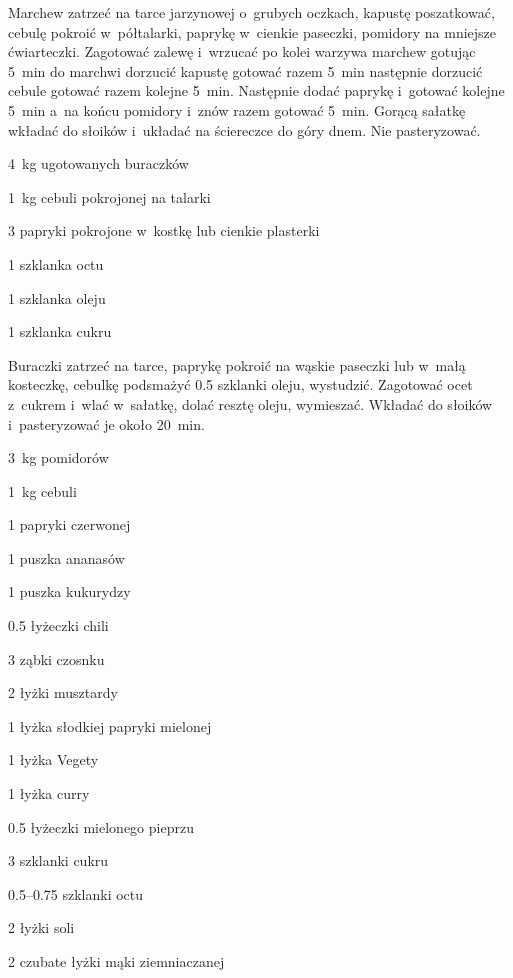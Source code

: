 \documentclass[../kucharek.tex]{subfiles}
\begin{document}
Marchew zatrzeć na tarce jarzynowej o~grubych oczkach, kapustę poszatkować,
cebulę pokroić w~półtalarki, paprykę w~cienkie paseczki, pomidory na mniejsze
ćwiarteczki. Zagotować zalewę i~wrzucać po kolei warzywa marchew gotując
\qty{5}{\minute} do marchwi dorzucić kapustę gotować razem \qty{5}{\minute}
następnie dorzucić cebule gotować razem kolejne \qty{5}{\minute}. Następnie
dodać paprykę i~gotować kolejne \qty{5}{\minute} a~na końcu pomidory i~znów
razem gotować \qty{5}{\minute}. Gorącą sałatkę wkładać do słoików i~układać na
ściereczce do góry dnem. Nie pasteryzować.


\begin{Ingred}
    \item \qty{4}{\kilo\gram} ugotowanych buraczków
    \item \qty{1}{\kilo\gram} cebuli pokrojonej na talarki
    \item \num{3} papryki pokrojone w~kostkę lub cienkie plasterki
    \item \num{1} szklanka octu
    \item \num{1} szklanka oleju
    \item \num{1} szklanka cukru
\end{Ingred}

Buraczki zatrzeć na tarce, paprykę pokroić na wąskie paseczki lub w~małą
kosteczkę, cebulkę podsmażyć \num{0.5} szklanki oleju, wystudzić. Zagotować
ocet z~cukrem i~wlać w~sałatkę, dolać resztę oleju, wymieszać. Wkładać do
słoików i~pasteryzować je około \qty{20}{\minute}.


\begin{Ingred}
    \item \qty{3}{\kilo\gram} pomidorów
    \item \qty{1}{\kilo\gram} cebuli
    \item \num{1} papryki czerwonej
    \item \num{1} puszka ananasów
    \item \num{1} puszka kukurydzy
    \item \num{0.5} łyżeczki chili
    \item \num{3} ząbki czosnku
    \item \num{2} łyżki musztardy
    \item \num{1} łyżka słodkiej papryki mielonej
    \item \num{1} łyżka Vegety
    \item \num{1} łyżka curry
    \item \num{0.5} łyżeczki mielonego pieprzu
    \item \num{3} szklanki cukru
    \item \numrange{0.5}{0.75} szklanki octu
    \item \num{2} łyżki soli
    \item \num{2} czubate łyżki mąki ziemniaczanej
\end{Ingred}
\end{document}
